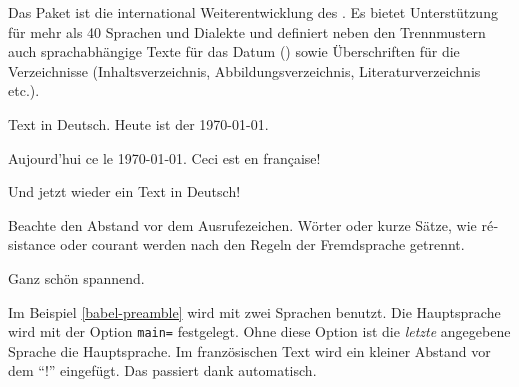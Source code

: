Das Paket  ist die international Weiterentwicklung des .
Es bietet Unterstützung für mehr als 40 Sprachen und Dialekte und definiert neben den Trennmustern 
auch sprachabhängige Texte für das Datum () sowie Überschriften für die Verzeichnisse 
(Inhaltsverzeichnis, Abbildungsverzeichnis, Literaturverzeichnis etc.).


\begin{lfgwprint}{}
 Text in Deutsch.
 Heute ist der \today.
 
 \begin{otherlanguage}{french}
 Aujourd'hui ce le \today.
 Ceci est en française!
 \end{otherlanguage}
 
 Und jetzt wieder ein Text in Deutsch!
 
 Beachte den Abstand vor dem Ausrufezeichen.
 Wörter oder kurze Sätze, 
 wie \foreignlanguage{french}{résistance} oder \foreignlanguage{french}{courant}
 werden nach den Regeln der Fremdsprache getrennt.
 
 Ganz schön spannend.
\end{lfgwprint}

Im Beispiel \ref{babel-preamble} wird  mit zwei Sprachen benutzt.
Die Hauptsprache wird mit der Option \texttt{main=} festgelegt.
Ohne diese Option ist die \emph{letzte} angegebene Sprache die Hauptsprache.
Im französischen Text wird ein kleiner Abstand vor dem \enquote{!} eingefügt.
Das passiert dank  automatisch.

